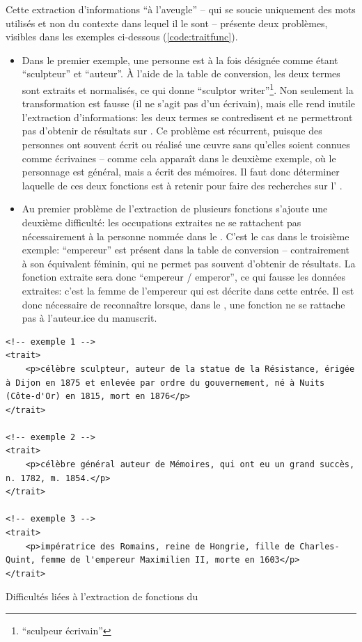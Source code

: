 Cette extraction d'informations \enquote{à l'aveugle} -- qui se soucie uniquement des mots utilisés et non du contexte dans lequel il le sont -- présente deux problèmes, visibles dans les exemples ci-dessous (\ref{code:traitfunc}). 
\begin{itemize}
	\item Dans le premier exemple, une personne est à la fois désignée comme étant \enquote{sculpteur} et \enquote{auteur}. À l'aide de la table de conversion, les deux termes sont extraits et normalisés, ce qui donne \enquote{sculptor writer}\footnote{\enquote{sculpeur écrivain}}. Non seulement la transformation est fausse (il ne s'agit pas d'un écrivain), mais elle rend inutile l'extraction d'informations: les deux termes se contredisent et ne permettront pas d'obtenir de résultats sur \wkd{}. Ce problème est récurrent, puisque des personnes ont souvent écrit ou réalisé une œuvre sans qu'elles soient connues comme écrivaines -- comme cela apparaît dans le deuxième exemple, où le personnage est général, mais a écrit des mémoires. Il faut donc déterminer laquelle de ces deux fonctions est à retenir pour faire des recherches sur l'\api{} \wkd{}. 
	\item Au premier problème de l'extraction de plusieurs fonctions s'ajoute une deuxième difficulté: les occupations extraites ne se rattachent pas nécessairement à la personne nommée dans le \tname{}. C'est le cas dans le troisième exemple: \enquote{empereur} est présent dans la table de conversion -- contrairement à son équivalent féminin, qui ne permet pas souvent d'obtenir de résultats. La fonction extraite sera donc \enquote{empereur / emperor}, ce qui fausse les données extraites: c'est la femme de l'empereur qui est décrite dans cette entrée. Il est donc nécessaire de reconnaître lorsque, dans le \ttrait{}, une fonction ne se rattache pas à l'auteur.ice du manuscrit.
\end{itemize}

\begin{listing}[h]
	\begin{verbatim}
<!-- exemple 1 -->
<trait>
	<p>célèbre sculpteur, auteur de la statue de la Résistance, érigée à Dijon en 1875 et enlevée par ordre du gouvernement, né à Nuits (Côte-d'Or) en 1815, mort en 1876</p>
</trait>

<!-- exemple 2 -->
<trait>
	<p>célèbre général auteur de Mémoires, qui ont eu un grand succès, n. 1782, m. 1854.</p>
</trait>

<!-- exemple 3 -->
<trait>
	<p>impératrice des Romains, reine de Hongrie, fille de Charles-Quint, femme de l'empereur Maximilien II, morte en 1603</p>
</trait>
	\end{verbatim}
	\caption{Difficultés liées à l'extraction de fonctions du \ttrait{}}
	\label{code:traitfunc}
\end{listing}

